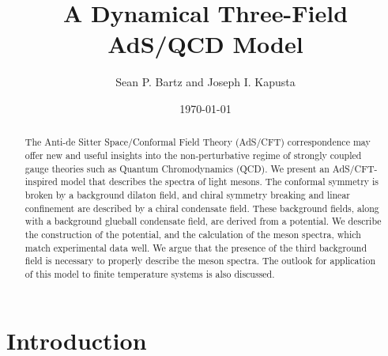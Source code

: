 \documentclass[aps,prd,12pt,nofootinbib]{revtex4}
\begin{document}
\title{{\bf A Dynamical Three-Field AdS/QCD Model}}
\author{Sean P. Bartz and Joseph I. Kapusta}


\vspace{.3cm}
\date{\today}

\parindent=20pt




\begin{abstract}
The Anti-de Sitter Space/Conformal Field Theory (AdS/CFT) correspondence may offer new and useful insights into the non-perturbative regime of strongly coupled gauge theories such as Quantum Chromodynamics (QCD). 
We present an AdS/CFT-inspired model that describes the spectra of light mesons. 
The conformal symmetry is broken by a background dilaton field, and chiral symmetry breaking and linear confinement are described by a chiral condensate field. 
These background fields, along with a background glueball condensate field, are derived from a potential. 
We describe the construction of the potential, and the calculation of the meson spectra, which match experimental data well. 
We argue that the presence of the third background field is necessary to properly describe the meson spectra. 
The outlook for application of this model to finite temperature systems is also discussed.
\end{abstract}

\maketitle
\vfill

\section{Introduction}
\end{document}
